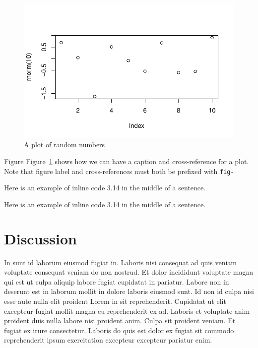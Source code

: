 \documentclass[
  super,
  preprint,
  3p]{elsarticle}
\begin{document}
\begin{figure}[H]

{\centering \includegraphics{index_files/figure-pdf/fig-demo-plot-1.pdf}

}

\caption{\label{fig-demo-plot}A plot of random numbers}

\end{figure}

Figure Figure~\ref{fig-demo-plot} shows how we can have a caption and
cross-reference for a plot. Note that figure label and cross-references
must both be prefixed with \texttt{fig-}

Here is an example of inline code 3.14 in the middle of a sentence.

Here is an example of inline code 3.14 in the middle of a sentence.

\hypertarget{discussion-1}{%
\section{Discussion}\label{discussion-1}}

In sunt id laborum eiusmod fugiat in. Laboris nisi consequat ad quis
veniam voluptate consequat veniam do non nostrud. Et dolor incididunt
voluptate magna qui est ut culpa aliquip labore fugiat cupidatat in
pariatur. Labore non in deserunt est in laborum mollit in dolore laboris
eiusmod sunt. Id non id culpa nisi esse aute nulla elit proident Lorem
in sit reprehenderit. Cupidatat ut elit excepteur fugiat mollit magna eu
reprehenderit ex ad. Laboris et voluptate anim proident duis nulla
labore nisi proident anim. Culpa sit proident veniam. Et fugiat ex irure
consectetur. Laboris do quis est dolor ex fugiat sit commodo
reprehenderit ipsum exercitation excepteur excepteur pariatur enim.
\end{document}
